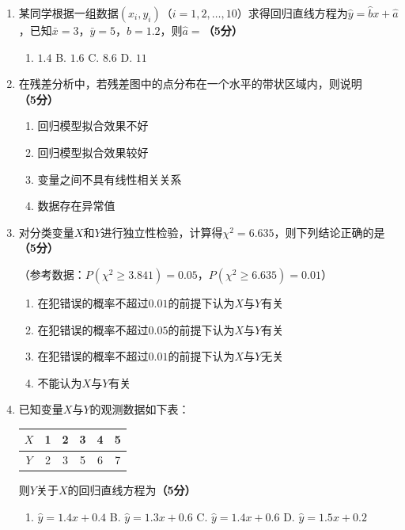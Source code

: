 \documentclass[12pt, a4paper]{ctexart}
\newcommand{\score}[1]{\hfill\textbf{（#1分）}}
\begin{document}
\begin{enumerate}[label=\textbf{\arabic*.}, leftmargin=2em]
\item 某同学根据一组数据$(x_i, y_i)$（$i=1,2,\ldots,10$）求得回归直线方程为$\hat{y} = \hat{b}x + \hat{a}$，已知$\bar{x} = 3$，$\bar{y} = 5$，$\hat{b} = 1.2$，则$\hat{a} = $\score{5}
\begin{enumerate}[label=\Alph*., leftmargin=2em]
\item $1.4$ \quad B. $1.6$ \quad C. $8.6$ \quad D. $11$
\end{enumerate}

\item 在残差分析中，若残差图中的点分布在一个水平的带状区域内，则说明\score{5}
\begin{enumerate}[label=\Alph*., leftmargin=2em]
\item 回归模型拟合效果不好
\item 回归模型拟合效果较好
\item 变量之间不具有线性相关关系
\item 数据存在异常值
\end{enumerate}

\item 对分类变量$X$和$Y$进行独立性检验，计算得$\chi^2 = 6.635$，则下列结论正确的是\score{5}

（参考数据：$P(\chi^2 \geqslant 3.841) = 0.05$，$P(\chi^2 \geqslant 6.635) = 0.01$）

\begin{enumerate}[label=\Alph*., leftmargin=2em]
\item 在犯错误的概率不超过$0.01$的前提下认为$X$与$Y$有关
\item 在犯错误的概率不超过$0.05$的前提下认为$X$与$Y$有关
\item 在犯错误的概率不超过$0.01$的前提下认为$X$与$Y$无关
\item 不能认为$X$与$Y$有关
\end{enumerate}

\item 已知变量$X$与$Y$的观测数据如下表：

\begin{center}
\begin{tabular}{|c|c|c|c|c|c|}
\hline
$X$ & 1 & 2 & 3 & 4 & 5 \\
\hline
$Y$ & 2 & 3 & 5 & 6 & 7 \\
\hline
\end{tabular}
\end{center}

则$Y$关于$X$的回归直线方程为\score{5}
\begin{enumerate}[label=\Alph*., leftmargin=2em]
\item $\hat{y} = 1.4x + 0.4$ \quad B. $\hat{y} = 1.3x + 0.6$ \quad C. $\hat{y} = 1.4x + 0.6$ \quad D. $\hat{y} = 1.5x + 0.2$
\end{enumerate}

\end{enumerate}
\end{document}
